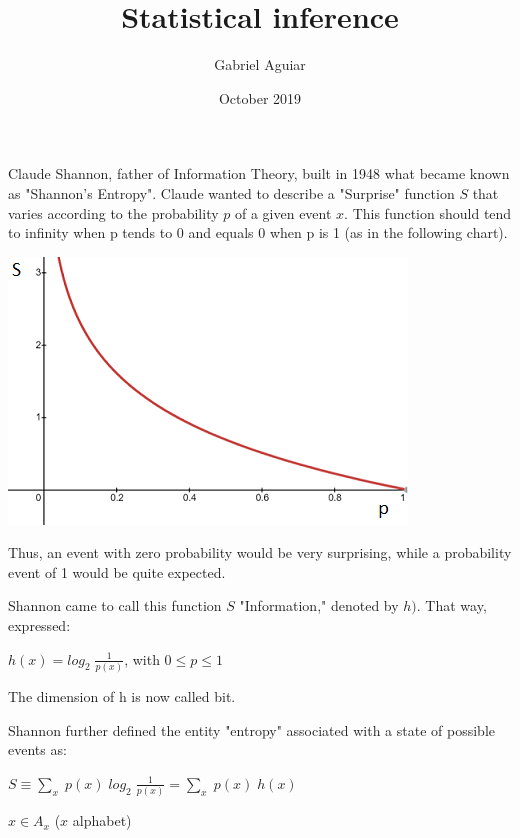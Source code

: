 \documentclass{article}
\title{Statistical inference}
\author{Gabriel Aguiar}
\date{October 2019}
\begin{document}
\maketitle

Claude Shannon, father of Information Theory, built in 1948 what became known as "Shannon's Entropy". Claude wanted to describe a "Surprise" function $S$ that varies according to the probability $p$ of a given event $x$. This function should tend to infinity when p tends to 0 and equals 0 when p is 1 (as in the following chart).

\hfill

\hfill

\includegraphics{graph}

\hfill

Thus, an event with zero probability would be very surprising, while a probability event of 1 would be quite expected.

Shannon came to call this function $S$ "Information," denoted by $h)$. That way, expressed:

\hfill

$h(x) = log_{2} \; \frac{1}{p(x)}$, with $0 \leq p \leq 1$

\hfill

The dimension of h is now called bit.

\hfill

\hfill

Shannon further defined the entity "entropy" associated with a state of possible events as:

\hfill

$S \equiv \sum\limits_{x} \; p(x) \; log_{2} \; \frac{1}{p(x)} = \sum\limits_{x} \; p(x) \; h(x)$

\hfill

$x \in A_{x}$ ($x$ alphabet)
\end{document}
